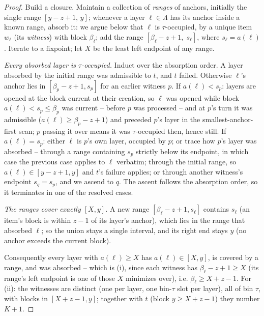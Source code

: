 \begin{proof}
Build a closure. Maintain a collection of \emph{ranges} of anchors, initially
the single range $[y - z + 1,\, y]$; whenever a layer $\ell \in \Lambda$ has
its anchor inside a known range, absorb it: we argue below that $\ell$ is
$\tau$-occupied, by a unique item $w_\ell$ (its \emph{witness}) with block
$\beta_\ell$; add the range $[\beta_\ell - z + 1,\; s_\ell]$, where
$s_\ell = a(\ell)$. Iterate to a fixpoint; let $X$ be the least left endpoint
of any range.

\emph{Every absorbed layer is $\tau$-occupied.} Induct over the absorption
order. A layer absorbed by the initial range was admissible to $t$, and $t$
failed. Otherwise $\ell$'s anchor lies in $[\beta_p - z + 1, s_p]$ for an
earlier witness $p$. If $a(\ell) < s_p$: layers are opened at the block
current at their creation, so $\ell$ was opened while block
$a(\ell) < s_p \le \beta_p$ was current -- before $p$ was processed -- and at
$p$'s turn it was admissible ($a(\ell) \ge \beta_p - z + 1$) and preceded
$p$'s layer in the smallest-anchor-first scan; $p$ passing it over means it
was $\tau$-occupied then, hence still. If $a(\ell) = s_p$: either $\ell$ is
$p$'s own layer, occupied by $p$; or trace how $p$'s layer was absorbed --
through a range containing $s_p$ strictly below its endpoint, in which case
the previous case applies to $\ell$ verbatim; through the initial range, so
$a(\ell) \in [y-z+1, y]$ and $t$'s failure applies; or through another
witness's endpoint $s_q = s_p$, and we ascend to $q$. The ascent follows the
absorption order, so it terminates in one of the resolved cases.

\emph{The ranges cover exactly $[X, y]$.} A new range
$[\beta_\ell - z + 1, s_\ell]$ contains $s_\ell$ (an item's block is within
$z - 1$ of its layer's anchor), which lies in the range that absorbed
$\ell$; so the union stays a single interval, and its right end stays $y$
(no anchor exceeds the current block).

Consequently every layer with $a(\ell) \ge X$ has $a(\ell) \in [X, y]$, is
covered by a range, and was absorbed -- which is (i), since each witness has
$\beta_\ell - z + 1 \ge X$ (its range's left endpoint is one of those $X$
minimizes over), i.e. $\beta_\ell \ge X + z - 1$. For (ii): the witnesses
are distinct (one per layer, one bin-$\tau$ slot per layer), all of bin
$\tau$, with blocks in $[X + z - 1, y]$; together with $t$ (block
$y \ge X + z - 1$) they number $K + 1$.
\end{proof}

